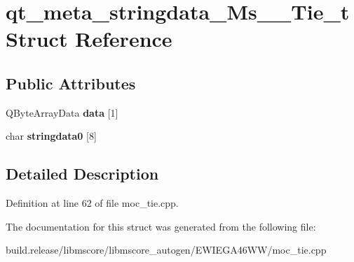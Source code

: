 \hypertarget{structqt__meta__stringdata___ms_____tie__t}{}\section{qt\+\_\+meta\+\_\+stringdata\+\_\+\+Ms\+\_\+\+\_\+\+Tie\+\_\+t Struct Reference}
\label{structqt__meta__stringdata___ms_____tie__t}
\subsection*{Public Attributes}
\begin{DoxyCompactItemize}
\item 
\mbox{\label{structqt__meta__stringdata___ms_____tie__t_ad3054d75c237f17a8c2ed155b0b4a102}} 
Q\+Byte\+Array\+Data {\bfseries data} \mbox{[}1\mbox{]}
\item 
\mbox{\label{structqt__meta__stringdata___ms_____tie__t_a60e8daef93f346ea512467e02b93adc6}} 
char {\bfseries stringdata0} \mbox{[}8\mbox{]}
\end{DoxyCompactItemize}


\subsection{Detailed Description}


Definition at line 62 of file moc\+\_\+tie.\+cpp.



The documentation for this struct was generated from the following file\+:\begin{DoxyCompactItemize}
\item 
build.\+release/libmscore/libmscore\+\_\+autogen/\+E\+W\+I\+E\+G\+A46\+W\+W/moc\+\_\+tie.\+cpp\end{DoxyCompactItemize}
